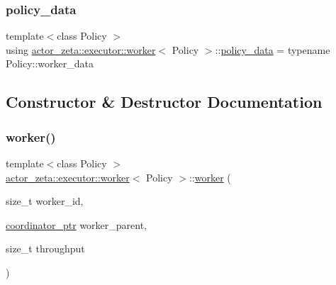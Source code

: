 \mbox{\label{classactor__zeta_1_1executor_1_1worker_ad8f39b0132441963ede8c1e8435aebb2}} 
\subsubsection{\texorpdfstring{policy\+\_\+data}{policy\_data}}
{\footnotesize\ttfamily template$<$class Policy $>$ \\
using \hyperlink{classactor__zeta_1_1executor_1_1worker}{actor\+\_\+zeta\+::executor\+::worker}$<$ Policy $>$\+::\hyperlink{classactor__zeta_1_1executor_1_1worker_ad8f39b0132441963ede8c1e8435aebb2}{policy\+\_\+data} =  typename Policy\+::worker\+\_\+data}



\subsection{Constructor \& Destructor Documentation}
\mbox{\label{classactor__zeta_1_1executor_1_1worker_a674d91050c8ae364156501f9abb7ecd3}} 
\subsubsection{\texorpdfstring{worker()}{worker()}\hspace{0.1cm}{\footnotesize\ttfamily [1/2]}}
{\footnotesize\ttfamily template$<$class Policy $>$ \\
\hyperlink{classactor__zeta_1_1executor_1_1worker}{actor\+\_\+zeta\+::executor\+::worker}$<$ Policy $>$\+::\hyperlink{classactor__zeta_1_1executor_1_1worker}{worker} (\begin{DoxyParamCaption}\item[{size\+\_\+t}]{worker\+\_\+id,  }\item[{\hyperlink{classactor__zeta_1_1executor_1_1worker_a0f64bbb63577325b5217ccee17a28738}{coordinator\+\_\+ptr}}]{worker\+\_\+parent,  }\item[{size\+\_\+t}]{throughput }\end{DoxyParamCaption})\hspace{0.3cm}{\ttfamily [inline]}}

